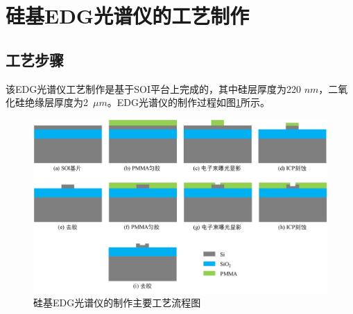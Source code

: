 \section{硅基EDG光谱仪的工艺制作}
\subsection{工艺步骤}
该EDG光谱仪工艺制作是基于SOI平台上完成的，其中硅层厚度为220 $nm$，二氧化硅绝缘层厚度为2~$\mu m$。EDG光谱仪的制作过程如图\ref{edg_fabrication}所示。

\begin{figure}[htb]
	\centering
	\includegraphics[width=15cm]{./Pictures/edg_fabrication.jpg}
	\captionsetup{justification=centering}
	\caption{硅基EDG光谱仪的制作主要工艺流程图}
	\label{edg_fabrication}
\end{figure}


